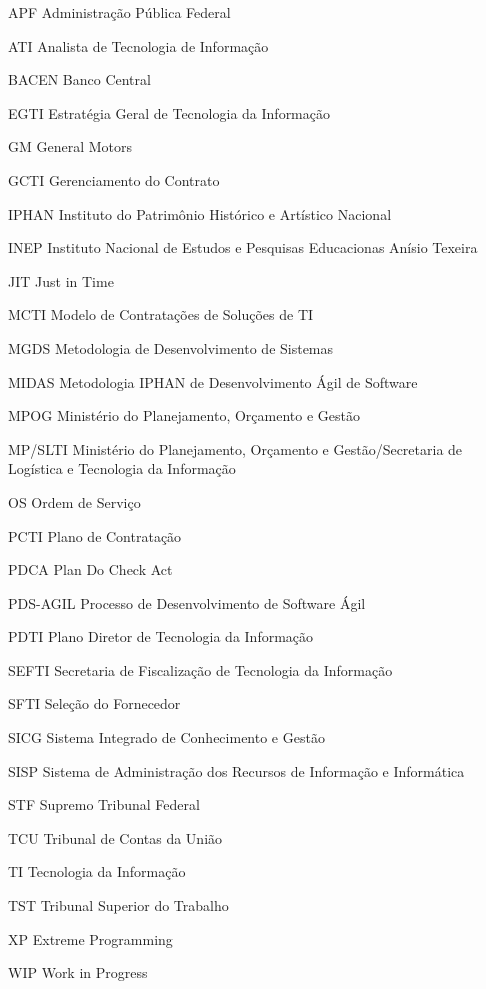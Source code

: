 \begin{siglas}
 \item[APF] Administração Pública Federal
  \item[ATI] Analista de Tecnologia de Informação
  \item[BACEN] Banco Central
  \item[EGTI] Estratégia Geral de Tecnologia da Informação
  \item[GM] General Motors
  \item[GCTI] Gerenciamento do Contrato
  \item[IPHAN] Instituto do Patrimônio Histórico e Artístico Nacional
  \item[INEP] Instituto Nacional de Estudos e Pesquisas Educacionas Anísio Texeira
  \item[JIT] Just in Time
  \item[MCTI] Modelo de Contratações de Soluções de TI 
  \item[MGDS] Metodologia de Desenvolvimento de Sistemas
  \item[MIDAS] Metodologia IPHAN de Desenvolvimento Ágil de Software
  \item[MPOG] Ministério do Planejamento, Orçamento e Gestão
  \item[MP/SLTI] Ministério do Planejamento, Orçamento e Gestão/Secretaria de Logística e Tecnologia da Informação
  \item[OS] Ordem de Serviço
  \item[PCTI] Plano de Contratação
  \item[PDCA] Plan Do Check Act
  \item[PDS-AGIL] Processo de Desenvolvimento de Software Ágil
  \item[PDTI] Plano Diretor de Tecnologia da Informação
  \item[SEFTI] Secretaria de Fiscalização de Tecnologia da Informação
  \item[SFTI] Seleção do Fornecedor
  \item[SICG] Sistema Integrado de Conhecimento e Gestão
  \item[SISP] Sistema de Administração dos Recursos de Informação e Informática
  \item[STF] Supremo Tribunal Federal
  \item[TCU] Tribunal de Contas da União
  \item[TI] Tecnologia da Informação 
  \item[TST] Tribunal Superior do Trabalho
  \item[XP] Extreme Programming
  \item[WIP] Work in Progress
\end{siglas}
